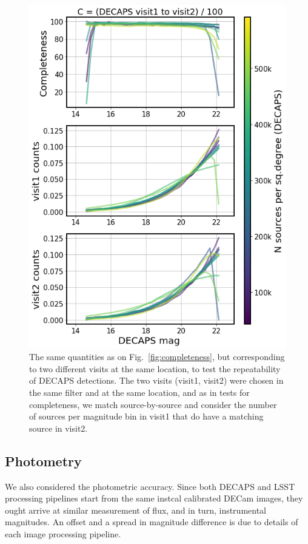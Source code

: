 \documentclass[DM,lsstdraft,toc,usenatbib]{lsstdoc}
\begin{document}
\begin{figure}
\begin{centering}
\includegraphics[width=0.75\columnwidth]{figs/completeness_3_decaps.png}
\caption{The same quantities as on Fig.~\ref{fig:completeness}, but corresponding to two different visits at the same location, to test the repeatability of DECAPS detections. The two visits (visit1, visit2) were chosen in the same filter and at the same location, and as in tests for completeness, we match source-by-source and consider the number of sources per magnitude bin in visit1 that do have a matching source in visit2. }
\label{fig:completeness_decaps}
\end{centering}
\end{figure} 




\subsection{Photometry}
\label{sec:photometry}

We also considered the photometric accuracy. Since both DECAPS and LSST processing pipelines start from the same instcal calibrated DECam images, they ought arrive at similar measurement of flux, and in turn, instrumental magnitudes.  An offset and a spread in magnitude difference is due to details of each image processing pipeline.
\end{document}
